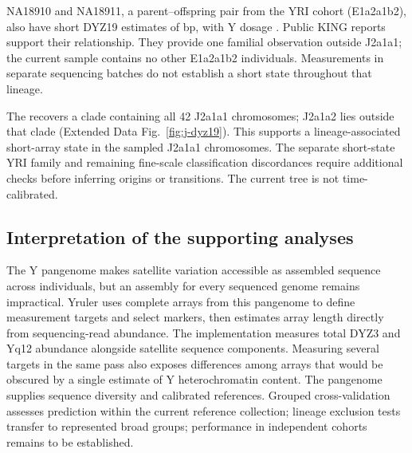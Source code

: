 NA18910 and NA18911, a parent--offspring pair from the YRI cohort (E1a2a1b2), also have short DYZ19 estimates of  bp, with Y dosage . Public KING reports support their relationship. They provide one familial observation outside J2a1a1; the current sample contains no other E1a2a1b2 individuals. Measurements in separate sequencing batches do not establish a short state throughout that lineage. 

The  recovers a clade containing all 42 J2a1a1 chromosomes; J2a1a2 lies outside that clade (Extended Data Fig.~\ref{fig:j-dyz19}). This supports a lineage-associated short-array state in the sampled J2a1a1 chromosomes. The separate short-state YRI family and remaining fine-scale classification discordances require additional checks before inferring origins or transitions. The current tree is not time-calibrated.

\subsection{Interpretation of the supporting analyses}
The Y pangenome makes satellite variation accessible as assembled sequence across individuals, but an assembly for every sequenced genome remains impractical. Yruler uses complete arrays from this pangenome to define measurement targets and select markers, then estimates array length directly from sequencing-read abundance. The implementation measures total DYZ3 and Yq12 abundance alongside satellite sequence components. Measuring several targets in the same pass also exposes differences among arrays that would be obscured by a single estimate of Y heterochromatin content. The pangenome supplies sequence diversity and calibrated references. Grouped cross-validation assesses prediction within the current reference collection; lineage exclusion tests transfer to represented broad groups; performance in independent cohorts remains to be established.

